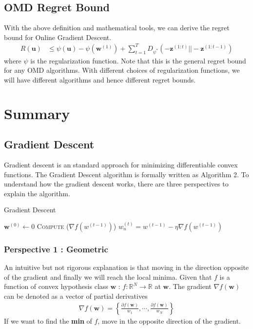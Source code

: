\documentclass[11pt]{article}
\begin{document}
\subsection{OMD Regret Bound}
With the above definition and mathematical tools, we can derive the regret bound for Online Gradient Descent.
\begin{align}
    R(\textbf{u}) &\leq \psi(\textbf{u}) -\psi(\textbf{w}^{(1)}) +\sum_{t=1}^{T} D_{\psi^{*}}(-\textbf{z}^{(1:t)}||-\textbf{z}^{(1:t-1)})
\end{align}
where $\psi$ is the regularization function. Note that this is the general regret bound for any OMD algorithms. With different choices of regularization functions, we will have different algorithms and hence different regret bounds.





\section{Summary}

\subsection{Gradient Descent}
Gradient descent is an standard approach for minimizing  differentiable convex functions. The Gradient Descent algorithm is formally written as Algorithm 2. To understand how the gradient descent works, there are three perspectives to explain the algorithm.

\begin{algorithm}[H]
\caption{Gradient Descent}
\label{algo:gd}
\begin{algorithmic}[1]
\STATE $\textbf{w}^{(0)} \leftarrow 0$ 
\STATE \textsc{Compute} ($\nabla{f(w^{(t-1)})}$)
\STATE $w_n^{(t)}= w^{(t-1)}-\eta\nabla{f(w^{(t-1)})}$ 
\ENDFOR
\end{algorithmic}
\end{algorithm}
\subsubsection{Perspective 1 : Geometric}
An intuitive but not rigorous explanation is that moving in the direction opposite of the gradient and finally we will reach the local minima. Given that $f$ is a function of convex hypothesis class $\boldsymbol{w}$ : $f : \mathbb{R} ^{N}\rightarrow \mathbb{R}$ at $\boldsymbol{w}$. The gradient $\nabla{f(\boldsymbol{w})}$ can be denoted as a vector of partial derivatives
\begin{align}
    \nabla f(\boldsymbol{w})=\left\{\frac{\partial f(\boldsymbol{w})}{w_{1}}, \cdots, \frac{\partial f(\boldsymbol{w})}{w_{N}}\right\}
\end{align} If we want to find the \textbf{min} of $f$, move in the opposite direction of the gradient. 
\end{document}
